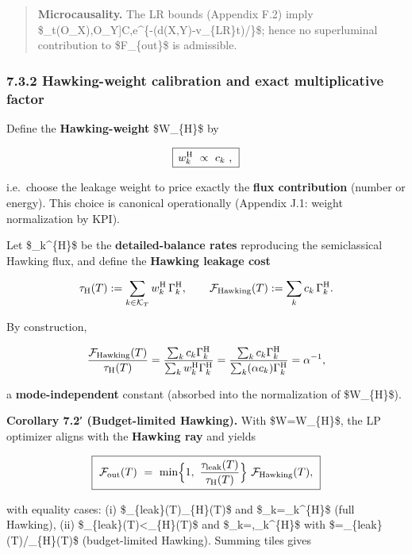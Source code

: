 \documentclass[
]{article}
\numberwithin{equation}{section}
\begin{document}
\begin{quote}
\textbf{Microcausality.} The LR bounds (Appendix F.2) imply
\$\textbar{[}\Phi\_t(O\_X),O\_Y{]}\textbar{}\le C,e\^{}\{-(d(X,Y)-v\_\{\rm LR\}t)/\xi\}\$;
hence no superluminal contribution to \$\mathcal F\_\{\rm out\}\$ is
admissible.
\end{quote}

\hypertarget{hawking-weight-calibration-and-exact-multiplicative-factor}{%
\subsubsection{7.3.2 Hawking-weight calibration and exact multiplicative
factor}\label{hawking-weight-calibration-and-exact-multiplicative-factor}}

Define the \textbf{Hawking-weight} \$W\_\{\rm H\}\$ by

\[
\boxed{\,w_k^{\rm H}\ \propto\ c_k\ ,\ }
\]

i.e.~choose the leakage weight to price exactly the \textbf{flux
contribution} (number or energy). This choice is canonical operationally
(Appendix J.1: weight normalization by KPI).

Let \$\Gamma\_k\^{}\{\rm H\}\$ be the \textbf{detailed-balance rates}
reproducing the semiclassical Hawking flux, and define the
\textbf{Hawking leakage cost}

\[
\tau_{\rm H}(T):=\sum_{k\in\mathcal K_T} w_k^{\rm H}\,\Gamma_k^{\rm H},\qquad
\mathcal F_{\rm Hawking}(T):=\sum_k c_k\,\Gamma_k^{\rm H}.
\]

By construction,

\[
\frac{\mathcal F_{\rm Hawking}(T)}{\tau_{\rm H}(T)}=\frac{\sum_k c_k\Gamma_k^{\rm H}}{\sum_k w_k^{\rm H}\Gamma_k^{\rm H}}=\frac{\sum_k c_k\Gamma_k^{\rm H}}{\sum_k (\alpha c_k)\Gamma_k^{\rm H}}=\alpha^{-1},
\]

a \textbf{mode-independent} constant (absorbed into the normalization of
\$W\_\{\rm H\}\$).

\textbf{Corollary 7.2′ (Budget-limited Hawking).} With
\$W=W\_\{\rm H\}\$, the LP optimizer aligns with the \textbf{Hawking
ray} and yields

\[
\boxed{\
\mathcal F_{\rm out}(T)\ =\ \min\!\Big\{1,\ \frac{\tau_{\rm leak}(T)}{\tau_{\rm H}(T)}\Big\}\ \mathcal F_{\rm Hawking}(T),
\ }
\]

with equality cases: (i) \$\tau\_\{\rm leak\}(T)\ge\tau\_\{\rm H\}(T)\$
and \$\Gamma\_k=\Gamma\_k\^{}\{\rm H\}\$ (full Hawking), (ii)
\$\tau\_\{\rm leak\}(T)\textless{}\tau\_\{\rm H\}(T)\$ and
\$\Gamma\_k=\alpha,\Gamma\_k\^{}\{\rm H\}\$ with
\$\alpha=\tau\_\{\rm leak\}(T)/\tau\_\{\rm H\}(T)\$ (budget-limited
Hawking). Summing tiles gives
\end{document}
